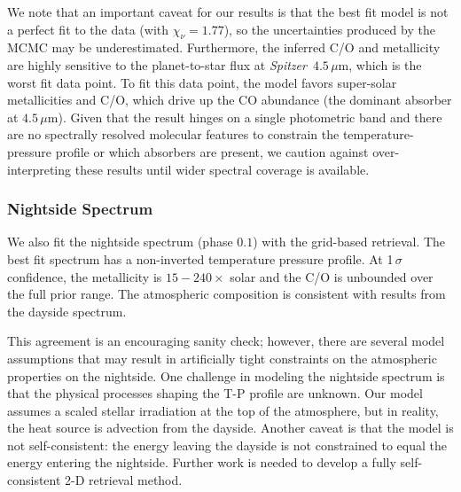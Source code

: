 \documentclass[twocolumn]{aastex61}
\newcommand{\project}[1]{\textsl{#1}}
\newcommand{\Spitzer}{\project{Spitzer}}
\begin{document}
We note that an important caveat for our results is that the best fit model is not a perfect fit to the data (with $\chi_\nu = 1.77$), so the uncertainties produced by the MCMC may be underestimated. Furthermore, the inferred C/O and metallicity are highly sensitive to the planet-to-star flux at \Spitzer\ $4.5\,\mu$m, which is the worst fit data point. To fit this data point, the model favors super-solar metallicities and C/O, which drive up the CO abundance (the dominant absorber at $4.5\,\mu$m). Given that the result hinges on a single photometric band and there are no spectrally resolved molecular features to constrain the temperature-pressure profile or which absorbers are present, we caution against over-interpreting these results until wider spectral coverage is available.


\subsubsection{Nightside Spectrum}
We also fit the nightside spectrum (phase $0.1$) with the grid-based retrieval. The best fit spectrum has a non-inverted temperature pressure profile.  At 1\,$\sigma$ confidence, the metallicity is $15 - 240\times$ solar and the C/O is unbounded over the full prior range. The atmospheric composition is consistent with results from the dayside spectrum. 

This agreement is an encouraging sanity check; however, there are several model assumptions that may result in artificially tight constraints on the atmospheric properties on the nightside.  One challenge in modeling the nightside spectrum is that the physical processes shaping the T-P profile are unknown.  Our model assumes a scaled stellar irradiation at the top of the atmosphere, but in reality, the heat source is advection from the dayside. Another caveat is that the model is not self-consistent: the energy leaving the dayside is not constrained to equal the energy entering the nightside.  Further work is needed to develop a fully self-consistent 2-D retrieval method. 
\end{document}
